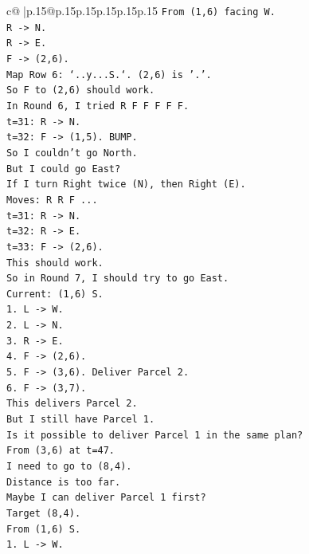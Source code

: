 \documentclass{article}
\begin{document}
{\begin{supertabular}{c@{$\;$}|p{.15\linewidth}@{}p{.15\linewidth}p{.15\linewidth}p{.15\linewidth}p{.15\linewidth}p{.15\linewidth}}
{{{\texttt{From (1,6) facing W.} \\
\texttt{R {-}> N.} \\
\texttt{R {-}> E.} \\
\texttt{F {-}> (2,6).} \\
\texttt{Map Row 6: `..y...S.`. (2,6) is '.'.} \\
\texttt{So F to (2,6) should work.} \\
\texttt{In Round 6, I tried R F F F F F.} \\
\texttt{t=31: R {-}> N.} \\
\texttt{t=32: F {-}> (1,5). BUMP.} \\
\texttt{So I couldn't go North.} \\
\texttt{But I could go East?} \\
\texttt{If I turn Right twice (N), then Right (E).} \\
\texttt{Moves: R R F ...} \\
\texttt{t=31: R {-}> N.} \\
\texttt{t=32: R {-}> E.} \\
\texttt{t=33: F {-}> (2,6).} \\
\texttt{This should work.} \\
\texttt{So in Round 7, I should try to go East.} \\
\texttt{Current: (1,6) S.} \\
\texttt{1. L {-}> W.} \\
\texttt{2. L {-}> N.} \\
\texttt{3. R {-}> E.} \\
\texttt{4. F {-}> (2,6).} \\
\texttt{5. F {-}> (3,6). Deliver Parcel 2.} \\
\texttt{6. F {-}> (3,7).} \\
\texttt{This delivers Parcel 2.} \\
\texttt{But I still have Parcel 1.} \\
\texttt{Is it possible to deliver Parcel 1 in the same plan?} \\
\texttt{From (3,6) at t=47.} \\
\texttt{I need to go to (8,4).} \\
\texttt{Distance is too far.} \\
\texttt{Maybe I can deliver Parcel 1 first?} \\
\texttt{Target (8,4).} \\
\texttt{From (1,6) S.} \\
\texttt{1. L {-}> W.} \\
}}}
\end{supertabular}}
\end{document}
